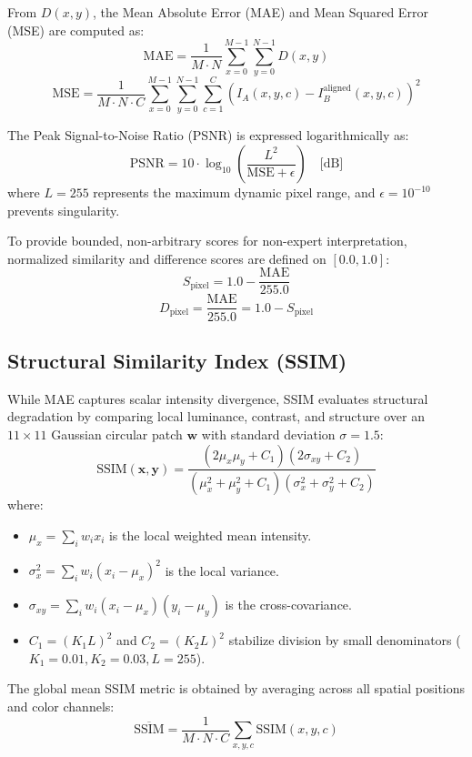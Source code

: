 \documentclass[conference]{IEEEtran}
\begin{document}
From $D(x, y)$, the Mean Absolute Error (MAE) and Mean Squared Error (MSE) are computed as:
\begin{equation}
\text{MAE} = \frac{1}{M \cdot N} \sum_{x=0}^{M-1} \sum_{y=0}^{N-1} D(x, y)
\end{equation}
\begin{equation}
\text{MSE} = \frac{1}{M \cdot N \cdot C} \sum_{x=0}^{M-1}\sum_{y=0}^{N-1}\sum_{c=1}^{C} \left( I_A(x, y, c) - I_B^{\text{aligned}}(x, y, c) \right)^2
\end{equation}

The Peak Signal-to-Noise Ratio (PSNR) is expressed logarithmically as:
\begin{equation}
\text{PSNR} = 10 \cdot \log_{10}\left( \frac{L^2}{\text{MSE} + \epsilon} \right) \quad \text{[dB]}
\end{equation}
where $L = 255$ represents the maximum dynamic pixel range, and $\epsilon = 10^{-10}$ prevents singularity.

To provide bounded, non-arbitrary scores for non-expert interpretation, normalized similarity and difference scores are defined on $[0.0, 1.0]$:
\begin{equation}
S_{\text{pixel}} = 1.0 - \frac{\text{MAE}}{255.0}
\end{equation}
\begin{equation}
D_{\text{pixel}} = \frac{\text{MAE}}{255.0} = 1.0 - S_{\text{pixel}}
\end{equation}

\subsection{Structural Similarity Index (SSIM)}
While MAE captures scalar intensity divergence, SSIM evaluates structural degradation by comparing local luminance, contrast, and structure over an $11 \times 11$ Gaussian circular patch $\mathbf{w}$ with standard deviation $\sigma = 1.5$:
\begin{equation}
\text{SSIM}(\mathbf{x}, \mathbf{y}) = \frac{(2\mu_x\mu_y + C_1)(2\sigma_{xy} + C_2)}{(\mu_x^2 + \mu_y^2 + C_1)(\sigma_x^2 + \sigma_y^2 + C_2)}
\end{equation}
where:
\begin{itemize}
    \item $\mu_x = \sum_{i} w_i x_i$ is the local weighted mean intensity.
    \item $\sigma_x^2 = \sum_{i} w_i (x_i - \mu_x)^2$ is the local variance.
    \item $\sigma_{xy} = \sum_{i} w_i (x_i - \mu_x)(y_i - \mu_y)$ is the cross-covariance.
    \item $C_1 = (K_1 L)^2$ and $C_2 = (K_2 L)^2$ stabilize division by small denominators ($K_1 = 0.01, K_2 = 0.03, L = 255$).
\end{itemize}
The global mean SSIM metric is obtained by averaging across all spatial positions and color channels:
\begin{equation}
\overline{\text{SSIM}} = \frac{1}{M \cdot N \cdot C}\sum_{x, y, c} \text{SSIM}(x, y, c)
\end{equation}
\end{document}
